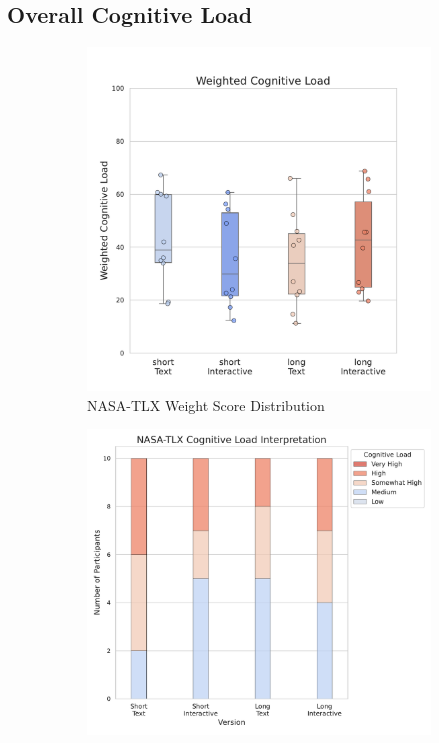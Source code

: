 \subsection{Overall Cognitive Load}
\label{sec:cog}
\begin{figure}[ht]
    \centering
    \begin{subfigure}[b]{0.45\textwidth}
        \centering
        \includegraphics[width=\textwidth]{content/image/results/nasatlx_final_value.pdf}
        \caption{NASA-TLX Weight Score Distribution}
        \label{fig:nasatlx-final1}
    \end{subfigure}
    \hfill
    \begin{subfigure}[b]{0.47\textwidth}
        \centering
        \includegraphics[width=\textwidth]{content/image/results/nasatlx_cog_value_interpreted.pdf}

\end{subfigure}
\end{figure}
